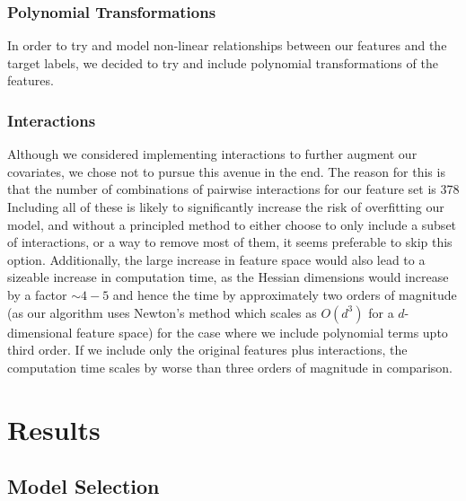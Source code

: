 \subsubsection{Polynomial Transformations}
In order to try and model non-linear relationships between our features and the target labels, we decided to try and include polynomial transformations of the features. 

\subsubsection{Interactions}
Although we considered implementing interactions to further augment our covariates, we chose not to pursue this avenue in the end. The reason for this is that the number of combinations of pairwise interactions for our feature set is 378 Including all of these is likely to significantly increase the risk of overfitting our model, and without a principled method to either choose to only include a subset of interactions, or a way to remove most of them, it seems preferable to skip this option. Additionally, the large increase in feature space would also lead to a sizeable increase in computation time, as the Hessian dimensions would increase by a factor $\sim 4-5$ and hence the time by approximately two orders of magnitude (as our algorithm uses Newton's method which scales as $O(d^3)$ for a $d$-dimensional feature space) for the case where we include polynomial terms upto third order. If we include only the original features plus interactions, the computation time scales by worse than three orders of magnitude in comparison.

\section{Results}
\label{results}

\subsection{Model Selection}

